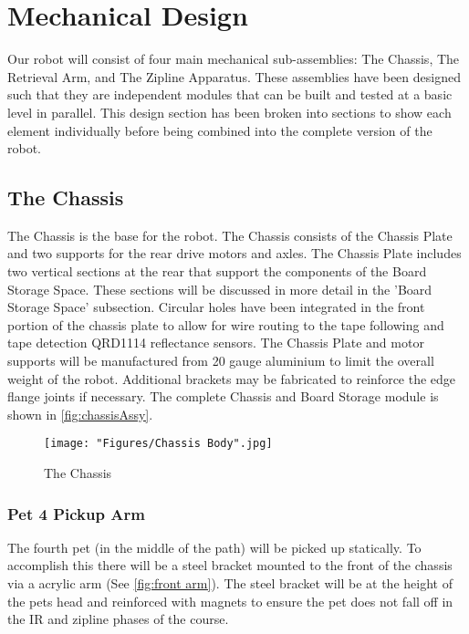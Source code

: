 \documentclass[11pt, oneside]{article} %
\begin{document}
\section{Mechanical Design}

Our robot will consist of four main mechanical sub-assemblies: The Chassis, The Retrieval Arm, and The Zipline Apparatus. These assemblies have been designed such that they are independent modules that can be built and tested at a basic level in parallel. This design section has been broken into sections to show each element individually before being combined into the complete version of the robot.

	\subsection{The Chassis}

	The Chassis is the base for the robot. The Chassis consists of the Chassis Plate and two supports for the rear drive motors and axles. The Chassis Plate includes two vertical sections at the rear that support the components of the Board Storage Space. These sections will be discussed in more detail in the 'Board Storage Space' subsection. Circular holes have been integrated in the front portion of the chassis plate to allow for wire routing to the tape following and tape detection QRD1114 reflectance sensors. The Chassis Plate and motor supports will be manufactured from 20 gauge aluminium to limit the overall weight of the robot. Additional brackets may be fabricated to reinforce the edge flange joints if necessary. The complete Chassis and Board Storage module is shown in \autoref{fig:chassisAssy}.

	\begin{figure}[h]
		\centering
		\texttt{[image: "Figures/Chassis Body".jpg]}
		\caption[Chassis]{The Chassis}
		\label{fig:1}
	\end{figure}

		\subsubsection{Pet 4 Pickup Arm}
		The fourth pet (in the middle of the path) will be picked up statically. To accomplish this there will be a steel bracket mounted to the front of the chassis via a acrylic arm (See \autoref{fig:front arm}). The steel bracket will be at the height of the pets head and reinforced with magnets to ensure the pet does not fall off in the IR and zipline phases of the course.
	
\end{document}
